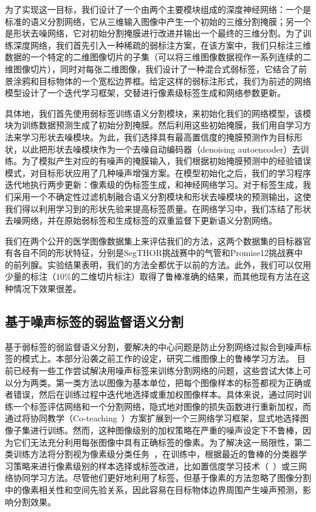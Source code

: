 为了实现这一目标，我们设计了一个由两个主要模块组成的深度神经网络：一个是标准的语义分割网络，它从三维输入图像中产生一个初始的三维分割掩膜；另一个是形状去噪网络，它对初始分割掩膜进行改进并输出一个最终的三维分割。为了训练深度网络，我们首先引入一种稀疏的弱标注方案，在该方案中，我们只标注三维数据的一个特定的二维图像切片的子集（可以将三维图像数据视作一系列连续的二维图像切片），同时对每张二维图像，我们设计了一种混合式弱标签，它结合了前景涂鸦和目标物体的一个宽松边界框。给定这样的弱标注形式，我们为前述的网络模型设计了一个迭代学习框架，交替进行像素级标签生成和网络参数更新。

具体地，我们首先使用弱标签训练语义分割模块，来初始化我们的网络模型，该模块为训练数据预测生成了初始分割掩膜。然后利用这些初始掩膜，我们用自学习方法来学习形状去噪模块。为此，我们选择具有最高置信度的掩膜预测作为目标形状，以此把形状去噪模块作为一个去噪自动编码器（denoising autoencoder）去训练\citep{vincent2010stacked,Sundermeyer_2018_ECCV}。为了模拟产生对应的有噪声的掩膜输入，我们根据初始掩膜预测中的经验错误模式，对目标形状应用了几种噪声增强方案。在模型初始化之后，我们的学习程序迭代地执行两步更新：像素级的伪标签生成，和神经网络学习。对于标签生成，我们采用一个不确定性过滤机制融合语义分割模块和形状去噪模块的预测输出，这使我们得以利用学习到的形状先验来提高标签质量。在网络学习中，我们冻结了形状去噪网络，并在原始弱标签和生成标签的双重监督下更新语义分割网络。

我们在两个公开的医学图像数据集上来评估我们的方法，这两个数据集的目标器官有各自不同的形状特征，分别是SegTHOR挑战赛\citep{trullo2019multiorgan}中的气管和Promise12挑战赛\citep{Litjens2014EvaluationOP}中的前列腺。实验结果表明，我们的方法全都优于以前的方法。此外，我们可以仅用少量的标注（10\%的二维切片标注）取得了鲁棒准确的结果，而其他现有方法在这种情况下效果很差。

\subsection{基于噪声标签的弱监督语义分割}
基于弱标签的弱监督语义分割，要解决的中心问题是防止分割网络过拟合到噪声标签的模式上。本部分沿袭之前工作的设定，研究二维图像上的鲁棒学习方法。
目前已经有一些工作尝试解决用噪声标签来训练分割网络的问题，这些尝试大体上可以分为两类。第一类方法以图像为基本单位，把每个图像样本的标签都视为正确或者错误，然后在训练过程中迭代地选择或重加权图像样本\citep{Zhu2019PickandLearnAQ,Xue2020CascadedRL}。具体来说，\citet{Zhu2019PickandLearnAQ}通过同时训练一个标签评估网络和一个分割网络，隐式地对图像的损失函数进行重新加权，而\citet{Xue2020CascadedRL}通过将协同教学（Co-teaching~\cite{Han2018CoteachingRT}）方案扩展到一个三网络学习框架，显式地选择图像子集进行训练。然而，这种图像级别的加权策略在严重的噪声设定下不鲁棒，因为它们无法充分利用每张图像中具有正确标签的像素。为了解决这一局限性，第二类训练方法将分割视为像素级分类任务~\citet{Zhang2020CharacterizingLE,Zhang2020RobustMI}，在训练中，根据最近的鲁棒的分类器学习策略来进行像素级别的样本选择或标签改进，比如置信度学习技术（~\cite{Zhang2020CharacterizingLE}）或三网络协同学习方法\citep{Zhang2020RobustMI}。尽管他们更好地利用了标签，但基于像素的方法忽略了图像分割中的像素相关性和空间先验关系，因此容易在目标物体边界周围产生噪声预测，影响分割效果。

